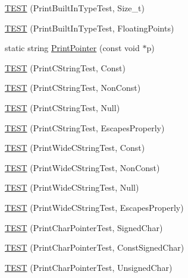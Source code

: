 \begin{DoxyCompactItemize}
\item 
\hyperlink{namespacetesting_1_1gtest__printers__test_a991dc124d153742c3ca126b2fa9ccab5}{\-T\-E\-S\-T} (\-Print\-Built\-In\-Type\-Test, \-Size\-\_\-t)
\item 
\hyperlink{namespacetesting_1_1gtest__printers__test_acde0b28d177604ddb5e185d7b107f6f7}{\-T\-E\-S\-T} (\-Print\-Built\-In\-Type\-Test, \-Floating\-Points)
\item 
static string \hyperlink{namespacetesting_1_1gtest__printers__test_a647fd599f6c81755c3cff8ceeba1740d}{\-Print\-Pointer} (const void $\ast$p)
\item 
\hyperlink{namespacetesting_1_1gtest__printers__test_a6cd47b21ad8d9ac66ba57b5b6415a924}{\-T\-E\-S\-T} (\-Print\-C\-String\-Test, \-Const)
\item 
\hyperlink{namespacetesting_1_1gtest__printers__test_a89d9905fecee1b976c26d35498734dd4}{\-T\-E\-S\-T} (\-Print\-C\-String\-Test, \-Non\-Const)
\item 
\hyperlink{namespacetesting_1_1gtest__printers__test_ad29b97d58a4d1e5e8dd4d854f66b9e22}{\-T\-E\-S\-T} (\-Print\-C\-String\-Test, \-Null)
\item 
\hyperlink{namespacetesting_1_1gtest__printers__test_a140030b990011abab91d4c0b59f21edd}{\-T\-E\-S\-T} (\-Print\-C\-String\-Test, \-Escapes\-Properly)
\item 
\hyperlink{namespacetesting_1_1gtest__printers__test_a4caa1f81979cdc6f5ada95e01a4fae63}{\-T\-E\-S\-T} (\-Print\-Wide\-C\-String\-Test, \-Const)
\item 
\hyperlink{namespacetesting_1_1gtest__printers__test_a8812b5f088e13083ebb8a7e35fbcdae7}{\-T\-E\-S\-T} (\-Print\-Wide\-C\-String\-Test, \-Non\-Const)
\item 
\hyperlink{namespacetesting_1_1gtest__printers__test_acd1267d49d61ad53b2b8a88f68fca3a7}{\-T\-E\-S\-T} (\-Print\-Wide\-C\-String\-Test, \-Null)
\item 
\hyperlink{namespacetesting_1_1gtest__printers__test_aa80d6bb47e6bf997dacf0c75322d12cf}{\-T\-E\-S\-T} (\-Print\-Wide\-C\-String\-Test, \-Escapes\-Properly)
\item 
\hyperlink{namespacetesting_1_1gtest__printers__test_acd7a56709621a91dca669023d192bdc7}{\-T\-E\-S\-T} (\-Print\-Char\-Pointer\-Test, \-Signed\-Char)
\item 
\hyperlink{namespacetesting_1_1gtest__printers__test_ae854b0ca4d06ffc273c391f262884681}{\-T\-E\-S\-T} (\-Print\-Char\-Pointer\-Test, \-Const\-Signed\-Char)
\item 
\hyperlink{namespacetesting_1_1gtest__printers__test_afb9a6a26323b287b7666b6adb5bdb149}{\-T\-E\-S\-T} (\-Print\-Char\-Pointer\-Test, \-Unsigned\-Char)

\end{DoxyCompactItemize}
